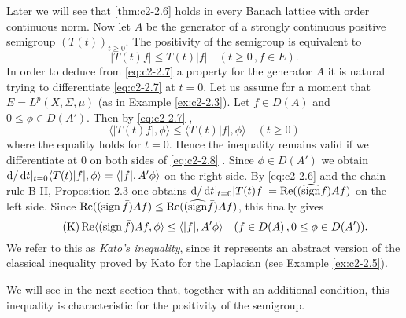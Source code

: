 Later we will see that \ref{thm:c2-2.6}   holds in every Banach lattice with order continuous norm.
Now let $A$ be the generator of a strongly continuous positive semigroup $(T(t))_{t \geq 0}$.
The positivity of the semigroup is equivalent to
\begin{equation}\label{eq:c2-2.7}
|T(t)f| \leq T(t)|f| \quad (t \geq 0 \,, f \in E)  .
\end{equation}
In order to deduce from \ref{eq:c2-2.7} a property for the generator $A$ it is natural trying to differentiate \ref{eq:c2-2.7} at $t = 0$.
Let us assume for a moment that $E = L^p(X,\Sigma,\mu)$ (as in Example \ref{ex:c2-2.3}).
Let $f \in D(A)$ and $0 \leq \phi \in D(A')$.
Then by \eqref{eq:c2-2.7}  ,
\begin{equation}\label{eq:c2-2.8}
	\langle |T(t)f|,\phi \rangle \leq \langle T(t)|f|,\phi \rangle \quad (t \geq 0)
\end{equation}
where the equality holds for $t = 0$.
Hence the inequality remains valid if we differentiate at $0$ on both sides of \eqref{eq:c2-2.8}  .
Since $\phi \in D(A')$ we obtain $\mathop{}\!\mathrm{d}{}/\mathop{}\!\mathrm{d}{t}|_{t=0} \langle T(t)|f|,\phi \rangle = \langle |f|,A'\phi \rangle$ on the right side.
By \eqref{eq:c2-2.6} and the chain rule B-II, Proposition 2.3 
one obtains $\mathop{}\!\mathrm{d}{}/\mathop{}\!\mathrm{d}{t}|_{t=0}|T(t)f| = \mathop{}\!\mathrm{Re}((\widehat{\operatorname{sign}} \bar{f})Af)$ on the left side.
Since $\mathop{}\!\mathrm{Re}((\operatorname{sign} \bar{f})Af) \leq \mathop{}\!\mathrm{Re}((\widehat{\operatorname{sign}} \bar{f})Af)$, this finally gives
\begin{equation*}\label{eq:c2-K} \tag{K}
\mathop{}\!\mathrm{Re}\langle(\operatorname{sign} \bar{f})Af,\phi \rangle \leq \langle |f|,A'\phi \rangle \quad (f \in D(A) \,, 0 \leq \phi \in D(A'))  .
\end{equation*}
We refer to this as \emph{Kato's inequality}, since it represents an abstract version of the classical inequality proved by Kato for the Laplacian (see Example \ref{ex:c2-2.5}).

We will see in the next section that, together with an additional condition, this inequality is characteristic for the positivity of the semigroup.

